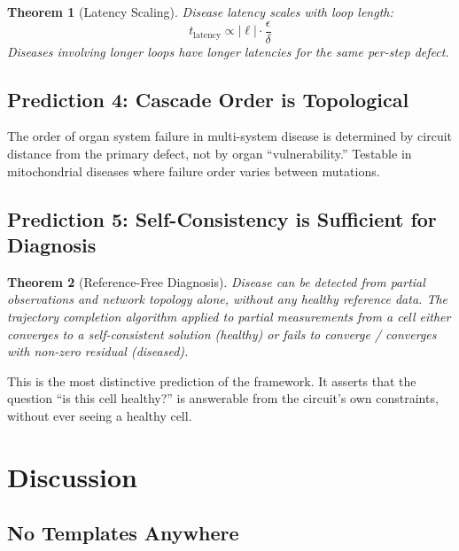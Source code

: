 \documentclass[10pt,twocolumn,a4paper]{article}
\theoremstyle{plain}
\newtheorem{theorem}{Theorem}[section]
\theoremstyle{definition}
\theoremstyle{remark}
\begin{document}
\begin{theorem}[Latency Scaling]
\label{thm:latency}
Disease latency scales with loop length:
\begin{equation}
    t_{\mathrm{latency}} \propto |\ell| \cdot \frac{\epsilon}{\delta}
\end{equation}
Diseases involving longer loops have longer latencies for the same per-step defect.
\end{theorem}

\subsection{Prediction 4: Cascade Order is Topological}

The order of organ system failure in multi-system disease is determined by circuit distance from the primary defect, not by organ ``vulnerability.'' Testable in mitochondrial diseases where failure order varies between mutations.

\subsection{Prediction 5: Self-Consistency is Sufficient for Diagnosis}

\begin{theorem}[Reference-Free Diagnosis]
\label{thm:reference_free}
Disease can be detected from partial observations and network topology alone, without any healthy reference data. The trajectory completion algorithm applied to partial measurements from a cell either converges to a self-consistent solution (healthy) or fails to converge / converges with non-zero residual (diseased).
\end{theorem}

This is the most distinctive prediction of the framework. It asserts that the question ``is this cell healthy?'' is answerable from the circuit's own constraints, without ever seeing a healthy cell.


\section{Discussion}
\label{sec:discussion}

\subsection{No Templates Anywhere}
\end{document}
